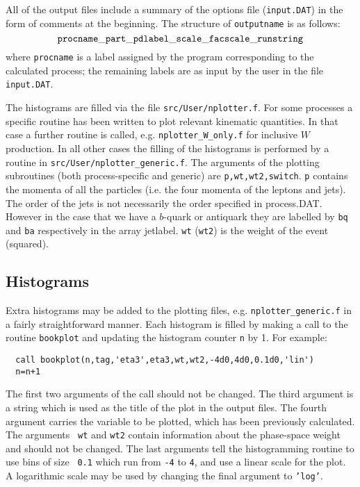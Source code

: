 \documentclass[12pt]{article}
\begin{document}
All of the output files include a summary of the options file ({\tt input.DAT}) in the form of
comments at the beginning. The structure
of {\tt outputname} is as follows:
\begin{displaymath}
{\tt procname\_part\_pdlabel\_scale\_facscale\_runstring}
\end{displaymath}
where {\tt procname} is a label assigned by the program corresponding to
the calculated process; the remaining labels are as input by the user
in the file {\tt input.DAT}.

The histograms are filled via the file {\tt src/User/nplotter.f}. For some processes
a specific routine has been written to plot relevant kinematic quantities. In that case
a further routine is called, e.g. {\tt nplotter\_W\_only.f} for inclusive $W$ production.
In all other cases the filling of the histograms is performed by a routine in
{\tt src/User/nplotter\_generic.f}. The arguments of the plotting subroutines (both process-specific
and generic) are { \tt p,wt,wt2,switch}. {\tt p} contains the momenta of all the particles
(i.e. the four momenta of the leptons and jets). The order of the jets is not
necessarily the  order specified in process.DAT.  However in the case that we have a 
$b$-quark or antiquark they are labelled by {\tt bq} and {\tt ba} respectively
in the array jetlabel. {\tt wt} ({\tt wt2}) is the weight of the event (squared).  

\subsection{Histograms}
\label{sec:histos}

Extra histograms may be added to the plotting files, e.g. {\tt nplotter\_generic.f} in
a fairly straightforward manner. Each histogram is filled by making
a call to the routine {\tt bookplot} and updating the histogram
counter {\tt n} by 1. For example:

\begin{verbatim}
  call bookplot(n,tag,'eta3',eta3,wt,wt2,-4d0,4d0,0.1d0,'lin')
  n=n+1
\end{verbatim}
The first two arguments of the call should not be changed. The third
argument is a string which is used as the title of the plot in the
output files. The fourth argument carries the variable to
be plotted, which has been previously calculated. The arguments {\tt
wt} and {\tt wt2} contain information about the phase-space weight and
should not be changed. The
last arguments tell the histogramming routine to use bins of size {\tt
0.1} which run from {\tt -4} to {\tt 4}, and use a linear scale for
the plot. A logarithmic scale may be used by changing the final
argument to {\tt 'log'}.
\end{document}
